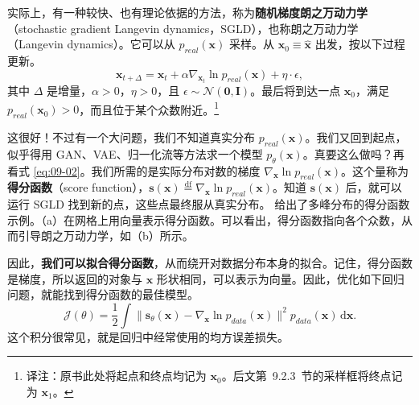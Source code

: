 实际上，有一种较快、也有理论依据的方法，称为\textbf{随机梯度朗之万动力学}（stochastic gradient Langevin dynamics，SGLD），也称朗之万动力学（Langevin dynamics）。它可以从 $p_{\mathit{real}}(\mathbf x)$ 采样。从 $\mathbf x_0\equiv\hat{\mathbf x}$ 出发，按以下过程更新。
\begin{equation}
  \mathbf x_{t+\Delta}=\mathbf x_t+\alpha\nabla_{\mathbf x_t}\ln p_{\mathit{real}}(\mathbf x)
    +\eta\cdot\epsilon,
  \tag{9.2}\label{eq:09-02}
\end{equation}
其中 $\Delta$ 是增量，$\alpha>0$，$\eta>0$，且 $\epsilon\sim\mathcal N(\mathbf 0,\mathbf I)$。最后将到达一点 $\mathbf x_0$，满足 $p_{\mathit{real}}(\mathbf x_0)>0$，而且位于某个众数附近。\footnote{译注：原书此处将起点和终点均记为 $\mathbf x_0$。后文第~9.2.3~节的采样框将终点记为 $\mathbf x_1$。}

这很好！不过有一个大问题，我们不知道真实分布 $p_{\mathit{real}}(\mathbf x)$。我们又回到起点，似乎得用 GAN、VAE、归一化流等方法求一个模型 $p_\theta(\mathbf x)$。真要这么做吗？再看式 \eqref{eq:09-02}。我们所需的是实际分布对数的梯度 $\nabla_{\mathbf x}\ln p_{\mathit{real}}(\mathbf x)$。这个量称为\textbf{得分函数}（score function），$\mathbf s(\mathbf x)\overset{\mathrm{df}}{=}\nabla_{\mathbf x}\ln p_{\mathit{real}}(\mathbf x)$。知道 $\mathbf s(\mathbf x)$ 后，就可以运行 SGLD 找到新的点，这些点最终服从真实分布。 给出了多峰分布的得分函数示例。（a）在网格上用向量表示得分函数。可以看出，得分函数指向各个众数，从而引导朗之万动力学，如（b）所示。


因此，\textbf{我们可以拟合得分函数}，从而绕开对数据分布本身的拟合。记住，得分函数是梯度，所以返回的对象与 $\mathbf x$ 形状相同，可以表示为向量。因此，优化如下回归问题，就能找到得分函数的最佳模型。
\begin{equation}
  \mathcal J(\theta)=\frac12\int
    \lVert\mathbf s_\theta(\mathbf x)-\nabla_{\mathbf x}\ln p_{\mathit{data}}(\mathbf x)\rVert^2
    p_{\mathit{data}}(\mathbf x)\,\mathrm d\mathbf x.
  \tag{9.3}\label{eq:09-03}
\end{equation}
这个积分很常见，就是回归中经常使用的均方误差损失。


